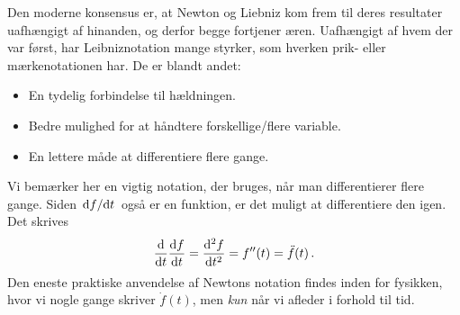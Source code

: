 Den moderne konsensus er, at Newton og Liebniz kom frem til deres resultater uafhængigt af hinanden, og derfor begge fortjener æren. Uafhængigt af hvem der var først, har Leibniznotation mange styrker, som hverken prik- eller mærkenotationen har. De er blandt andet: 
\begin{itemize}
    \item En tydelig forbindelse til hældningen.
    \item Bedre mulighed for at håndtere forskellige/flere variable.
    \item En lettere måde at differentiere flere gange.
\end{itemize}
Vi bemærker her en vigtig notation, der bruges, når man differentierer flere gange. Siden $\dv*{f}{t}$ også er en funktion, er det muligt at differentiere den igen. Det skrives
\begin{equation}
    \dv{}{t}\dv{f}{t}(t)=\dv[2]{f}{t}=f''(t)=\Ddot{f}(t)\, .
\end{equation}
Den eneste praktiske anvendelse af Newtons notation findes inden for fysikken, hvor vi nogle gange skriver $\dot{f}(t)$, men \emph{kun} når vi afleder i forhold til tid. 

